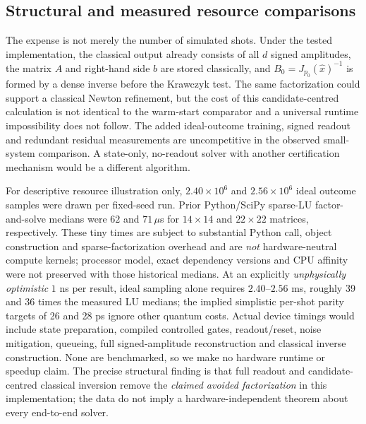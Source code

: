 \documentclass[11pt,a4paper]{article}
\theoremstyle{remark}\newtheorem{remark}[theorem]{Remark}
\begin{document}
\subsection{Structural and measured resource comparisons}
The expense is not merely the number of simulated shots. Under the tested implementation, the classical output already consists of all $d$ signed amplitudes, the matrix $A$ and right-hand side $b$ are stored classically, and $B_0=J_{p_0}(\widehat x)^{-1}$ is formed by a dense inverse before the Krawczyk test. The same factorization could support a classical Newton refinement, but the cost of this candidate-centred calculation is not identical to the warm-start comparator and a universal runtime impossibility does not follow. The added ideal-outcome training, signed readout and redundant residual measurements are uncompetitive in the observed small-system comparison. A state-only, no-readout solver with another certification mechanism would be a different algorithm.

For descriptive resource illustration only, $2.40\times10^6$ and $2.56\times10^6$ ideal outcome samples were drawn per fixed-seed run. Prior Python/SciPy sparse-LU factor-and-solve medians were $62$ and $71\,\mu$s for $14\times14$ and $22\times22$ matrices, respectively. These tiny times are subject to substantial Python call, object construction and sparse-factorization overhead and are \emph{not} hardware-neutral compute kernels; processor model, exact dependency versions and CPU affinity were not preserved with those historical medians. At an explicitly \emph{unphysically optimistic} $1$ ns per result, ideal sampling alone requires $2.40$--$2.56$ ms, roughly 39 and 36 times the measured LU medians; the implied simplistic per-shot parity targets of 26 and 28 ps ignore other quantum costs. Actual device timings would include state preparation, compiled controlled gates, readout/reset, noise mitigation, queueing, full signed-amplitude reconstruction and classical inverse construction. None are benchmarked, so we make no hardware runtime or speedup claim. The precise structural finding is that full readout and candidate-centred classical inversion remove the \emph{claimed avoided factorization} in this implementation; the data do not imply a hardware-independent theorem about every end-to-end solver.
\end{document}
